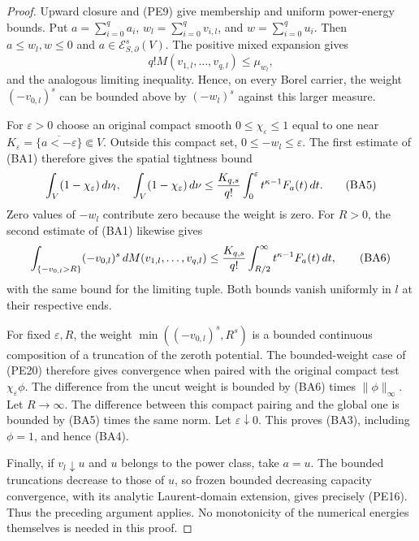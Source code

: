 \documentclass[11pt,a4paper]{article}
\numberwithin{equation}{section}
\theoremstyle{definition}
\theoremstyle{remark}
\begin{document}
\begin{proof}
Upward closure and (PE9) give membership and uniform power-energy
bounds. Put
$a=\sum_{i=0}^q a_i$, $w_l=\sum_{i=0}^qv_{i,l}$, and
$w=\sum_{i=0}^q u_i$. Then $a\leq w_l,w\leq0$ and
$a\in\mathcal E^s_{S,\partial}(V)$.
The positive mixed expansion gives
\[
             q!M(v_{1,l},\ldots,v_{q,l})\leq\mu_{w_l},
\]
and the analogous limiting inequality. Hence, on every Borel
carrier, the weight $(-v_{0,l})^s$ can be bounded above by
$(-w_l)^s$ against this larger measure.

For $\varepsilon>0$ choose an original compact smooth
$0\leq\chi_\varepsilon\leq1$ equal to one near
$K_\varepsilon=\overline{\{a<-\varepsilon\}}\Subset V$.
Outside this compact set, $0\leq-w_l\leq\varepsilon$.
The first estimate of (BA1) therefore gives the spatial
tightness bound
\[
 \int_V(1-\chi_\varepsilon)\,d\nu_l,
 \quad\int_V(1-\chi_\varepsilon)\,d\nu
       \leq {K_{q,s}\over q!}
                    \int_0^\varepsilon t^{\kappa-1}F_a(t)\,dt.
 \tag{BA5}
\]
Zero values of $-w_l$ contribute zero because the weight is zero.
For $R>0$, the second estimate of (BA1) likewise gives
\[
 \int_{\{-v_{0,l}>R\}}(-v_{0,l})^s\,
                        dM(v_{1,l},\ldots,v_{q,l})
       \leq {K_{q,s}\over q!}
                    \int_{R/2}^\infty t^{\kappa-1}F_a(t)\,dt,
 \tag{BA6}
\]
with the same bound for the limiting tuple. Both bounds vanish
uniformly in $l$ at their respective ends.

For fixed $\varepsilon,R$, the weight
$\min((-v_{0,l})^s,R^s)$ is a bounded continuous composition
of a truncation of the zeroth potential. The bounded-weight
case of (PE20) therefore gives convergence when paired with
the original compact test $\chi_\varepsilon\phi$.
The difference from the uncut weight is bounded by (BA6)
times $\|\phi\|_\infty$. Let $R\to\infty$.
The difference between this compact pairing and the global
one is bounded by (BA5) times the same norm. Let
$\varepsilon\downarrow0$. This proves (BA3), including
$\phi=1$, and hence (BA4).

Finally, if $v_l\downarrow u$ and $u$ belongs to the power
class, take $a=u$. The bounded truncations decrease to those
of $u$, so frozen bounded decreasing capacity convergence,
with its analytic Laurent-domain extension, gives precisely
(PE16). Thus the preceding argument applies. No monotonicity
of the numerical energies themselves is needed in this proof.
\end{proof}
\end{document}

